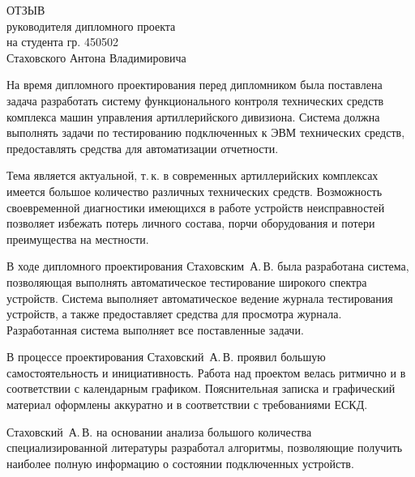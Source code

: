 
\thispagestyle{empty}


{
  \begin{center}
    \begin{minipage}{0.8\textwidth}
      \begin{center}
        {\normalsize ОТЗЫВ}\\
	      руководителя дипломного проекта\\
	      на студента гр. 450502\\
	      Стаховского Антона Владимировича\\
      \end{center}
    \end{minipage}
  \end{center}

На время дипломного проектирования перед дипломником была поставлена задача разработать систему
	функционального контроля технических средств комплекса машин управления артиллерийского дивизиона. Система
	должна выполнять задачи по тестированию подключенных к ЭВМ технических средств, предоставлять средства для
	автоматизации отчетности.

Тема является актуальной, т.\,к. в современных артиллерийских комплексах имеется большое количество различных
	технических средств.
Возможность своевременной диагностики имеющихся в работе устройств неисправностей позволяет избежать потерь личного
	состава, порчи оборудования и потери преимущества на местности.

В ходе дипломного проектирования Стаховским~А.\,В. была разработана система, позволяющая выполнять автоматическое
	тестирование широкого спектра устройств. Система выполняет автоматическое ведение журнала
	тестирования устройств, а также предоставляет средства для просмотра журнала. Разработанная
	система выполняет все поставленные задачи.

В процессе проектирования Стаховский~А.\,В. проявил большую самостоятельность и инициативность.
Работа над проектом велась ритмично и в соответствии с календарным графиком.
Пояснительная записка и графический материал оформлены аккуратно и в соответствии с требованиями ЕСКД.

Стаховский~А.\,В. на основании анализа большого количества специализированной литературы разработал алгоритмы,
	позволяющие получить наиболее полную информацию о состоянии подключенных устройств.


}
